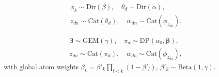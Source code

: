 %
%


\begin{equation}\label{eq:lda-gen}
\begin{gathered}
\phi_k \sim \mathrm{Dir}(\beta),\quad
\theta_d \sim \mathrm{Dir}(\alpha),\\
z_{dn} \sim \mathrm{Cat}(\theta_d),\quad
w_{dn} \sim \mathrm{Cat}(\phi_{z_{dn}}).
\end{gathered}
\end{equation}

\begin{equation}\label{eq:hdp-gen}
\begin{gathered}
\boldsymbol{\beta}\sim\mathrm{GEM}(\gamma),\quad
\pi_d \sim \mathrm{DP}(\alpha_0,\boldsymbol{\beta}),\\
z_{dn}\sim\mathrm{Cat}(\pi_d),\quad
w_{dn}\sim\mathrm{Cat}(\phi_{z_{dn}}),
\end{gathered}
\end{equation}
with global atom weights $\beta_k=\beta'_k\prod_{l<k}(1-\beta'_l)$,
$\beta'_k\sim\mathrm{Beta}(1,\gamma)$.

